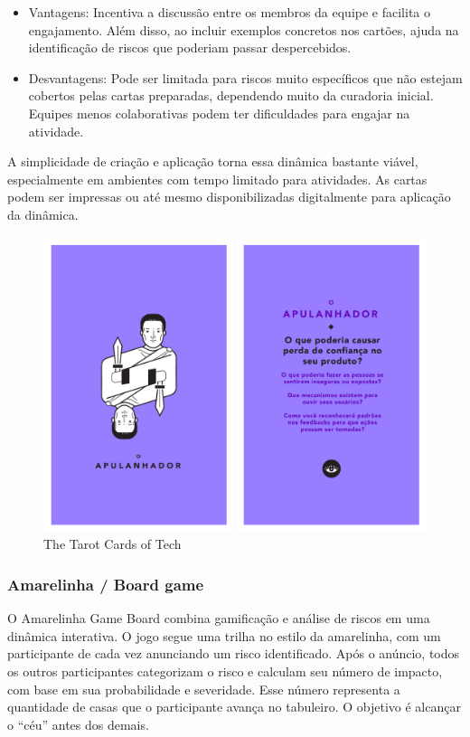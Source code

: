 \documentclass[
	12pt,
	openright,
	twoside,
	a4paper,
	english,
	brazil
	]{abntex2}
\begin{document}
\begin{itemize}
  \item Vantagens: Incentiva a discussão entre os membros da equipe e facilita o engajamento. Além disso, ao incluir exemplos concretos nos cartões, ajuda na identificação de riscos que poderiam passar despercebidos.  
  \item Desvantagens: Pode ser limitada para riscos muito específicos que não estejam cobertos pelas cartas preparadas, dependendo muito da curadoria inicial. Equipes menos colaborativas podem ter dificuldades para engajar na atividade.
\end{itemize}
  
A simplicidade de criação e aplicação torna essa dinâmica bastante viável, especialmente em ambientes com tempo limitado para atividades. As cartas podem ser impressas ou até mesmo disponibilizadas digitalmente para aplicação da dinâmica.

\begin{figure}[H]
	\caption{\label{tarot-da-tecnologia}The Tarot Cards of Tech}
  \includegraphics[width=\textwidth]{tarot-da-tecnologia}
\end{figure}

\subsubsection{Amarelinha / Board game}

O Amarelinha Game Board combina gamificação e análise de riscos em uma dinâmica interativa. O jogo segue uma trilha no estilo da amarelinha, com um participante de cada vez anunciando um risco identificado. Após o anúncio, todos os outros participantes categorizam o risco e calculam seu número de impacto, com base em sua probabilidade e severidade. Esse número representa a quantidade de casas que o participante avança no tabuleiro. O objetivo é alcançar o “céu” antes dos demais.
\end{document}

